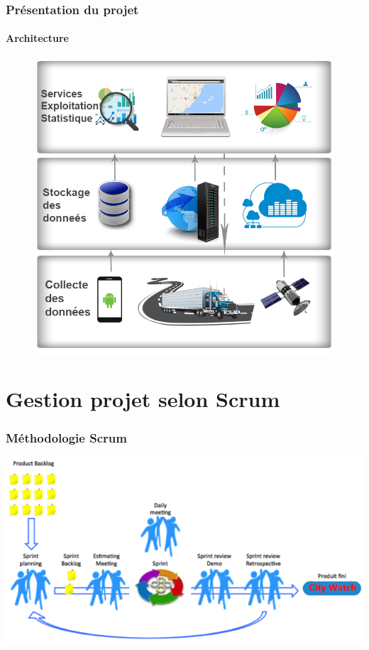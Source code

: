 \documentclass{beamer}
\begin{document}
\begin{frame}
    \frametitle{Présentation du projet}
    \framesubtitle{Architecture}
    \begin{figure}
        \centering
        \includegraphics[width=.73\textwidth]{figures/citywatch-modules.png}
    \end{figure}
\end{frame}

\section{Gestion projet selon Scrum}


\begin{frame}
    \frametitle{Méthodologie Scrum}
    \centering
    \includegraphics{figures/scrum-model}
\end{frame}
\end{document}
